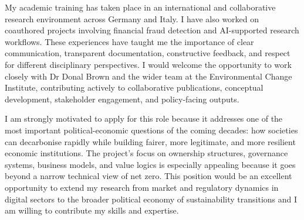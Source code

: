 \documentclass{nfr}
\begin{document}
My academic training has taken place in an international and collaborative research environment across Germany and Italy. I have also worked on coauthored projects involving financial fraud detection and AI-supported research workflows. These experiences have taught me the importance of clear communication, transparent documentation, constructive feedback, and respect for different disciplinary perspectives. I would welcome the opportunity to work closely with Dr Donal Brown and the wider team at the Environmental Change Institute, contributing actively to collaborative publications, conceptual development, stakeholder engagement, and policy-facing outputs.

I am strongly motivated to apply for this role because it addresses one of the most important political-economic questions of the coming decades: how societies can decarbonise rapidly while building fairer, more legitimate, and more resilient economic institutions. The project's focus on ownership structures, governance systems, business models, and value logics is especially appealing because it goes beyond a narrow technical view of net zero. This position would be an excellent opportunity to extend my research from market and regulatory dynamics in digital sectors to the broader political economy of sustainability transitions and I am willing to contribute my skills and expertise.
\end{document}
